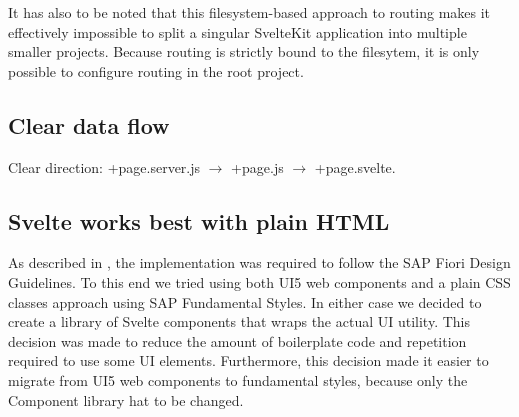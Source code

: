 It has also to be noted that this filesystem-based approach to routing makes it effectively impossible to split a singular SvelteKit application into multiple smaller projects. Because routing is strictly bound to the filesytem, it is only possible to configure routing in the root project.


\subsection{Clear data flow}

Clear direction: +page.server.js $\rightarrow$ +page.js $\rightarrow$ +page.svelte.

\subsection{Svelte works best with plain HTML}

As described in , the implementation was required to follow the SAP Fiori Design Guidelines. To this end we tried using both UI5 web components and a plain CSS classes approach using SAP Fundamental Styles. In either case we decided to create a library of Svelte components that wraps the actual UI utility. This decision was made to reduce the amount of boilerplate code and repetition required to use some UI elements. Furthermore, this decision made it easier to migrate from UI5 web components to fundamental styles, because only the Component library hat to be changed. 






